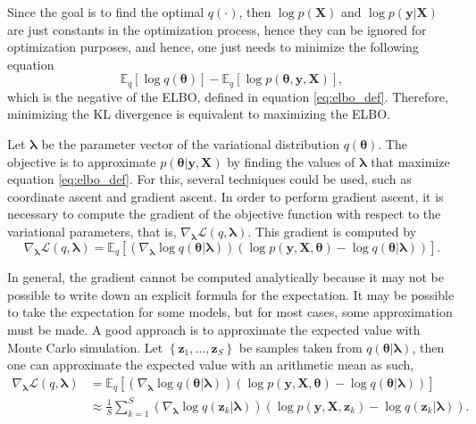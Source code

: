 Since the goal is to find the optimal $q(\cdot)$, then $\log p(\boldsymbol{X})$ and $\log p(\boldsymbol{y} | \boldsymbol{X})$ are just constants in the optimization process, hence they can be ignored for optimization purposes, and hence, one just needs to minimize the following equation
\begin{equation}
  \mathbb{E}_q \left[ \log  q(\boldsymbol{\theta}) \right] - \mathbb{E}_q \left[ \log p(\boldsymbol{\theta}, \boldsymbol{y}, \boldsymbol{X}) \right],
\end{equation}
which is the negative of the ELBO, defined in equation \eqref{eq:elbo_def}. Therefore, minimizing the KL divergence is equivalent to maximizing the ELBO.

Let $\boldsymbol{\lambda}$ be the parameter vector of the variational distribution $q(\boldsymbol{\theta})$. The objective is to approximate $p(\boldsymbol{\theta} | \boldsymbol{y}, \boldsymbol{X})$ by finding the values of $\boldsymbol{\lambda}$ that maximize equation \eqref{eq:elbo_def}. For this, several techniques could be used, such as coordinate ascent and gradient ascent. In order to perform gradient ascent, it is necessary to compute the gradient of the objective function with respect to the variational parameters, that is, $\nabla_{\boldsymbol{\lambda}} \mathcal{L}(q, \boldsymbol{\lambda})$. This gradient is computed by
\begin{equation}
  \label{eq:ELBO_gradient}
  \nabla_{\boldsymbol{\lambda}} \mathcal{L}(q, \boldsymbol{\lambda}) =
  \mathbb{E}_q \left[ \left( \nabla_{\boldsymbol{\lambda}} \log q(\boldsymbol{\theta} | \boldsymbol{\lambda}) \right) \left( \log p(\boldsymbol{y}, \boldsymbol{X}, \boldsymbol{\theta}) - \log q(\boldsymbol{\theta} | \boldsymbol{\lambda}) \right) \right].
\end{equation}

In general, the gradient cannot be computed analytically because it may not be possible to write down an explicit formula for the expectation. It may be possible to take the expectation for some models, but for most cases, some approximation must be made. A good approach is to approximate the expected value with Monte Carlo simulation. Let $\left\{ \boldsymbol{z}_1, ..., \boldsymbol{z}_S \right\}$ be samples taken from $q(\boldsymbol{\theta} | \boldsymbol{\lambda})$, then one can approximate the expected value with an arithmetic mean as such,
\begin{equation}
  \begin{split}
  \nabla_{\boldsymbol{\lambda}} \mathcal{L}(q, \boldsymbol{\lambda}) &=
  \mathbb{E}_q \left[ \left( \nabla_{\boldsymbol{\lambda}} \log q(\boldsymbol{\theta} | \boldsymbol{\lambda}) \right) \left( \log p(\boldsymbol{y}, \boldsymbol{X}, \boldsymbol{\theta}) - \log q(\boldsymbol{\theta} | \boldsymbol{\lambda}) \right) \right] \\
  & \approx \frac{1}{S} \sum_{k = 1}^S \left( \nabla_{\boldsymbol{\lambda}} \log q(\boldsymbol{z}_k | \boldsymbol{\lambda}) \right) \left( \log p(\boldsymbol{y}, \boldsymbol{X}, \boldsymbol{z}_k) - \log q(\boldsymbol{z}_k | \boldsymbol{\lambda}) \right).
  \end{split}
\end{equation}

